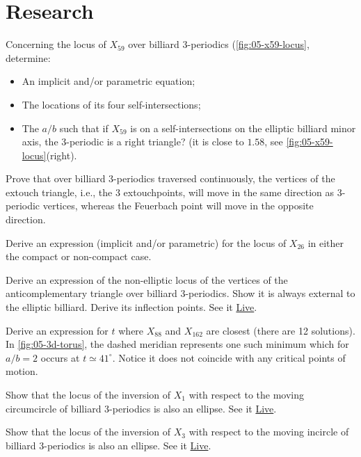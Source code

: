 \section{Research}

\begin{question}
Concerning the locus of $X_{59}$ over billiard 3-periodics (\cref{fig:05-x59-locus}, determine:
\begin{itemize}
\item An implicit and/or parametric equation;
\item The locations of its four self-intersections;
\item The $a/b$ such that if $X_{59}$ is on a self-intersections on the elliptic billiard minor axis, the 3-periodic is a right triangle? (it is close to $1.58$, see \cref{fig:05-x59-locus}(right).
\end{itemize}
\end{question}

\begin{question}
Prove that over billiard 3-periodics traversed continuously, the vertices of the extouch triangle, i.e., the 3 extouchpoints, will move in the same direction as 3-periodic vertices, whereas the Feuerbach point will move in the opposite direction.  
\end{question}

\begin{question}
Derive an expression (implicit and/or parametric) for the locus of $X_{26}$ in either the compact or non-compact case.
\end{question}

\begin{question}
Derive an expression of the non-elliptic locus of the vertices of the anticomplementary triangle over billiard 3-periodics. Show it is always external to the elliptic billiard. Derive its inflection points. See it \href{https://bit.ly/2RtUT00}{Live}.
\end{question}

\begin{question}
\label{que:05-x88-x162}
Derive an expression for $t$ where $X_{88}$ and $X_{162}$ are closest (there are 12 solutions). In \cref{fig:05-3d-torus}, the dashed meridian represents one such minimum which for $a/b=2$ occurs at $t{\simeq}41^\circ$. Notice it does not coincide with any critical points of motion.
\end{question}

\begin{question}
Show that the locus of the inversion of $X_1$ with respect to the moving circumcircle of billiard 3-periodics is also an ellipse. See it \href{https://bit.ly/3ujusan}{Live}.
\end{question}

\begin{question}
Show that the locus of the inversion of $X_3$ with respect to the moving incircle of billiard 3-periodics is also an ellipse. See it \href{https://bit.ly/2SwDLa4}{Live}.
\end{question}